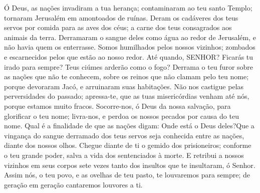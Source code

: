 {\PP 
  Ó Deus, as nações invadiram a tua herança; contaminaram ao teu santo Templo; tornaram Jerusalém em amontoados de ruínas.
  Deram os cadáveres dos teus servos por comida para as aves dos céus; a carne dos teus consagrados aos animais da terra.
  Derramaram o sangue deles como água ao redor de Jerusalém, e não havia quem os enterrasse.
  Somos humilhados pelos nossos vizinhos; zombados e escarnecidos pelos que estão ao nosso redor.
  Até quando, SENHOR? Ficarás tu irado para sempre? Teus ciúmes arderão como o fogo?
  Derrama o teu furor sobre as nações que não te conhecem, sobre os reinos que não clamam pelo teu nome;
  porque devoraram Jacó, e arruinaram suas habitações.
  Não nos castigue pelas perversidades do passado; apressa-te, que as tuas misericórdias venham até nós, porque estamos muito fracos.
  Socorre-nos, ó Deus da nossa salvação, para glorificar o teu nome; livra-nos, e perdoa os nossos pecados por causa do teu nome.
  Qual é a finalidade de que as nações digam: Onde está o Deus deles?Que a vingança do sangue derramado dos teus servos seja conhecida entre as nações, diante dos nossos olhos.
  Chegue diante de ti o gemido dos prisioneiros; conforme o teu grande poder,
 salva a vida dos sentenciados à morte.
  E retribui a nossos vizinhos em seus corpos sete vezes tanto dos insultos que te insultaram, ó Senhor.
  Assim nós, o teu povo, e as ovelhas de teu pasto, te louvaremos para sempre; de geração em geração cantaremos louvores a ti.
\par }


